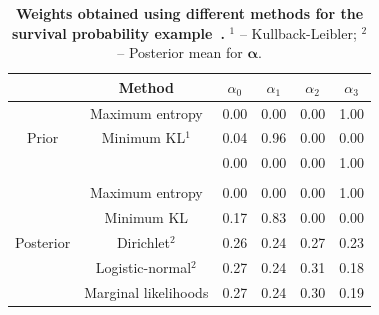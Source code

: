 \documentclass[a4paper, notitlepage, 11pt]{article}
\begin{document}
\begin{table}[ht]
\caption{\textbf{Weights obtained using different methods for the survival probability example~\citep{Savchuk1994}.}
$^1$ -- Kullback-Leibler; $^2$ -- Posterior mean for $\boldsymbol\alpha$.}
\centering
\begin{tabular}{cccccc}
\hline
                           & Method                & $\alpha_0$   & $\alpha_1$   & $\alpha_2$   & $\alpha_3$\\
\hline
\multirow{3}{*}{Prior}     & Maximum entropy       & 0.00 & 0.00 & 0.00 & 1.00  \\
                           & Minimum KL$^1$        & 0.04 & 0.96 & 0.00 & 0.00 \\
                           & \cite{Rufo2012A}      & 0.00 & 0.00 & 0.00 & 1.00  \\
                           &                       &      &      &      &      \\
\multirow{5}{*}{Posterior} & Maximum entropy       & 0.00 & 0.00 & 0.00 & 1.00  \\
                           & Minimum KL            & 0.17 & 0.83 & 0.00 & 0.00 \\
                           & Dirichlet$^2$        & 0.26 & 0.24 & 0.27 & 0.23 \\
                           & Logistic-normal$^2$ & 0.27 & 0.24 & 0.31 & 0.18 \\
                           & Marginal likelihoods  & 0.27 & 0.24 & 0.30 & 0.19\\
\hline                
\end{tabular}
\label{tab:alphasBeta}
\end{table}
\end{document}
